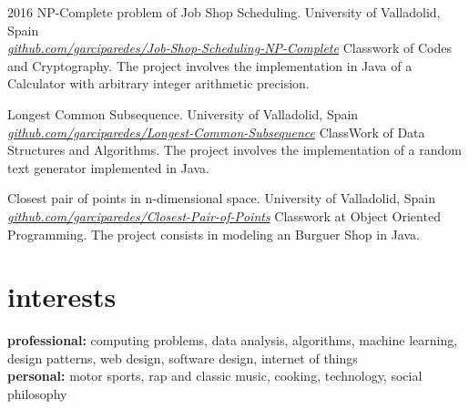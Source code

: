 \documentclass[]{friggeri-cv} %
\begin{document}
\begin{entrylist}
  
  \entry
    {2016}
    {NP-Complete problem of Job Shop Scheduling. }
    {University of Valladolid, Spain \\ 
    \href{https://github.com/garciparedes/Job-Shop-Scheduling-NP-Complete}{\textit{github.com/garciparedes/Job-Shop-Scheduling-NP-Complete}}}
    {Classwork of Codes and Cryptography. The project involves the implementation in Java of a Calculator with  arbitrary integer arithmetic precision.}
  
  \entry
    {}
    {Longest Common Subsequence.}
    {University of Valladolid, Spain \\
    \href{https://github.com/garciparedes/Longest-Common-Subsequence}{\textit{github.com/garciparedes/Longest-Common-Subsequence}} }
    {ClassWork of Data Structures and Algorithms. The project involves the implementation of a random text generator implemented in Java.}
    
    \entry
    {}
    {Closest pair of points in n-dimensional space.}
    {University of Valladolid, Spain \\ 
    \href{https://github.com/garciparedes/Closest-Pair-of-Points}{\textit{github.com/garciparedes/Closest-Pair-of-Points}}}
    {Classwork at Object Oriented Programming. The project consists in modeling an Burguer Shop  in Java.}

\end{entrylist}

\section{interests}

\textbf{professional:} computing problems, data analysis, algorithms, machine learning, design patterns, web design, software design, internet of things \\
\textbf{personal:} motor sports, rap and classic music, cooking, technology, social philosophy
\end{document}
